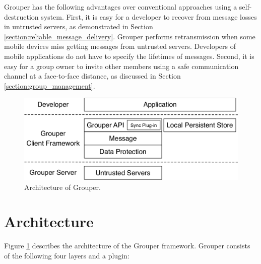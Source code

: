\documentclass[a4paper,11pt]{report}
\begin{document}
Grouper has the following advantages over conventional approaches using a self-destruction system.
First, it is easy for a developer to recover from message losses in untrusted servers, as demonstrated in Section \ref{section:reliable_message_delivery}.
Grouper performs retransmission when some mobile devices miss getting messages from untrusted servers.
Developers of mobile applications do not have to specify the lifetimes of messages.
Second, it is easy for a group owner to invite other members using a safe communication channel at a face-to-face distance, as discussed in Section \ref{section:group_management}.

\begin{figure}[t]
	\centering
	\includegraphics[scale=0.6]{architecture}
	\caption{Architecture of Grouper.}
	\label{fig:architecture}
\end{figure}

\section{Architecture} \label{section:architecture}

Figure \ref{fig:architecture} describes the architecture of the Grouper framework. 
Grouper consists of the following four layers and a plugin:
\end{document}
